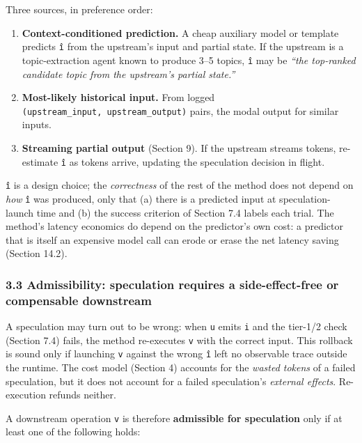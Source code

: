 \documentclass[
  11pt,
]{article}
\providecommand{\tightlist}{%
  \setlength{\itemsep}{0pt}\setlength{\parskip}{0pt}}
\begin{document}
Three sources, in preference order:

\begin{enumerate}
\def\labelenumi{\arabic{enumi}.}
\tightlist
\item
  \textbf{Context-conditioned prediction.} A cheap auxiliary model or
  template predicts \texttt{î} from the upstream's input and partial
  state. If the upstream is a topic-extraction agent known to produce
  3--5 topics, \texttt{î} may be \emph{``the top-ranked candidate topic
  from the upstream's partial state.''}
\item
  \textbf{Most-likely historical input.} From logged
  \texttt{(upstream\_input,\ upstream\_output)} pairs, the modal output
  for similar inputs.
\item
  \textbf{Streaming partial output} (Section 9). If the upstream streams
  tokens, re-estimate \texttt{î} as tokens arrive, updating the
  speculation decision in flight.
\end{enumerate}

\texttt{î} is a design choice; the \emph{correctness} of the rest of the
method does not depend on \emph{how} \texttt{î} was produced, only that
(a) there is a predicted input at speculation-launch time and (b) the
success criterion of Section 7.4 labels each trial. The method's latency
economics do depend on the predictor's own cost: a predictor that is
itself an expensive model call can erode or erase the net latency saving
(Section 14.2).

\subsubsection{3.3 Admissibility: speculation requires a
side-effect-free or compensable
downstream}\label{admissibility-speculation-requires-a-side-effect-free-or-compensable-downstream}

A speculation may turn out to be wrong: when \texttt{u} emits \texttt{i}
and the tier-1/2 check (Section 7.4) fails, the method re-executes
\texttt{v} with the correct input. This rollback is sound only if
launching \texttt{v} against the wrong \texttt{î} left no observable
trace outside the runtime. The cost model (Section 4) accounts for the
\emph{wasted tokens} of a failed speculation, but it does not account
for a failed speculation's \emph{external effects}. Re-execution refunds
neither.

A downstream operation \texttt{v} is therefore \textbf{admissible for
speculation} only if at least one of the following holds:
\end{document}
